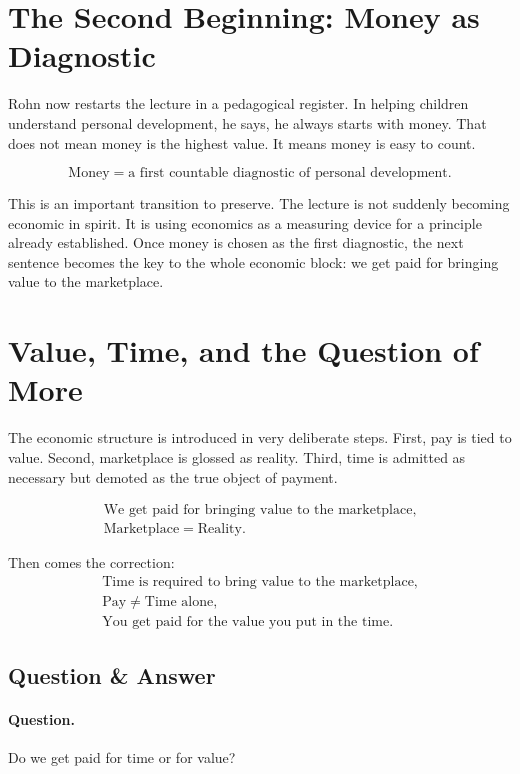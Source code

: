 \section{The Second Beginning: Money as Diagnostic}

Rohn now restarts the lecture in a pedagogical register. In helping children understand personal development, he says, he always starts with money. That does not mean money is the highest value. It means money is easy to count.

\begin{equation}
\text{Money}=\text{a first countable diagnostic of personal development}.
\end{equation}

This is an important transition to preserve. The lecture is not suddenly becoming economic in spirit. It is using economics as a measuring device for a principle already established. Once money is chosen as the first diagnostic, the next sentence becomes the key to the whole economic block: we get paid for bringing value to the marketplace.

\section{Value, Time, and the Question of More}

The economic structure is introduced in very deliberate steps. First, pay is tied to value. Second, marketplace is glossed as reality. Third, time is admitted as necessary but demoted as the true object of payment.

\begin{align}
\text{We get paid for bringing value to the marketplace},\\
\text{Marketplace}=\text{Reality}.
\end{align}

Then comes the correction:
\begin{align}
\text{Time is required to bring value to the marketplace},\\
\text{Pay} \neq \text{Time alone},\\
\text{You get paid for the value you put in the time}.
\end{align}

\subsection{Question \& Answer}

\paragraph{Question.} Do we get paid for time or for value?

